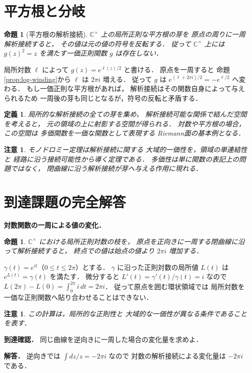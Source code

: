 \documentclass[a5paper,10pt,onecolumn]{jsarticle}
\makeatletter
\theoremstyle{mathnotetheorem}
\newtheorem{definition}[theorem]{定義}
\newtheorem{proposition}[theorem]{命題}
\newtheorem{remark}[theorem]{注意}
\renewcommand{\proofname}{証明}
\renewenvironment{proof}[1][\proofname]{%
  \par\pushQED{\qed}\normalfont\topsep4\p@\@plus2\p@\relax
  \trivlist\item[\hskip\labelsep\bfseries #1]\ignorespaces
}{\popQED\endtrivlist\@endpefalse}
\makeatother
\begin{document}
\section{平方根と分岐}

\begin{proposition}[平方根の解析接続]\label{prop:sqrt}
$\mathbb C^\times$ 上の局所正則な平方根の芽を
原点の周りに一周解析接続すると，
その値は元の値の符号を反転する．
従って $\mathbb C^\times$ 上には
$g(z)^2=z$ を満たす一価正則関数 $g$ は存在しない．
\end{proposition}
\begin{proof}
局所対数 $\ell$ によって
$g(z)=e^{\ell(z)/2}$ と書ける．
原点を一周すると
命題\ref{prop:log-winding}から
$\ell$ は $2\pi i$ 増える．
従って $g$ は
$e^{(\ell+2\pi i)/2}=-e^{\ell/2}$ へ変わる．
もし一価正則な平方根があれば，
解析接続はその関数自身によって与えられるため
一周後の芽も同じとなるが，符号の反転と矛盾する．
\end{proof}

\begin{definition}
局所的な解析接続の全ての芽を集め，
解析接続可能な関係で結んだ空間を考えると，
元の領域の上に射影する空間が得られる．
対数や平方根の場合，この空間は
多価関数を一価な関数として表現する
\emph{Riemann面}の基本例となる．
\end{definition}

\begin{remark}
モノドロミー定理は解析接続に関する
大域的一価性を，領域の単連結性と
経路に沿う接続可能性から導く定理である．
多価性は単に関数の表記上の問題ではなく，
閉曲線に沿う解析接続が芽へ与える作用に現れる．
\end{remark}

\section{到達課題の完全解答}
\noindent\textbf{対数関数の一周による値の変化．}
\begin{proposition}
$\mathbb C^\times$ における局所正則対数の枝を，
原点を正向きに一周する閉曲線に沿って解析接続すると，
終点での値は始点の値より $2\pi i$ 増加する．
\end{proposition}
\begin{proof}
$\gamma(t)=e^{it}$（$0\le t\le2\pi$）とする．
$\gamma$ に沿った正則対数の局所値 $L(t)$ は
$e^{L(t)}=\gamma(t)$ を満たす．
微分すると
$L'(t)=\gamma'(t)/\gamma(t)=i$ なので
$L(2\pi)-L(0)=\int_0^{2\pi}i\,dt=2\pi i$．
従って原点を囲む環状領域では
局所対数を一価な正則関数へ貼り合わせることはできない．
\end{proof}
\begin{remark}
この計算は，局所的な正則性と
大域的な一価性が異なる条件であることを表す．
\end{remark}
\noindent\textbf{到達確認．}
同じ曲線を逆向きに一周した場合の変化量を求めよ．
\par\noindent\textbf{解答．}
逆向きでは $\int dz/z=-2\pi i$ なので
対数の解析接続による変化量は $-2\pi i$ である．
\end{document}
